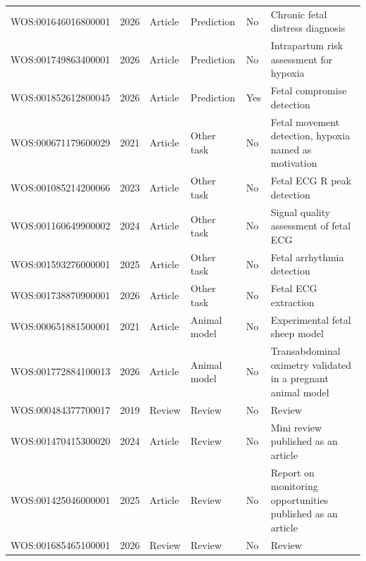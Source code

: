 \begin{longtable}{@{}p{3.5cm}rlllp{5.2cm}@{}}
WOS:001646016800001 & 2026 & Article & Prediction & No & Chronic fetal distress diagnosis \\
WOS:001749863400001 & 2026 & Article & Prediction & No & Intrapartum risk assessment for hypoxia \\
WOS:001852612800045 & 2026 & Article & Prediction & Yes & Fetal compromise detection \\
WOS:000671179600029 & 2021 & Article & Other task & No & Fetal movement detection, hypoxia named as motivation \\
WOS:001085214200066 & 2023 & Article & Other task & No & Fetal ECG R peak detection \\
WOS:001160649900002 & 2024 & Article & Other task & No & Signal quality assessment of fetal ECG \\
WOS:001593276000001 & 2025 & Article & Other task & No & Fetal arrhythmia detection \\
WOS:001738870900001 & 2026 & Article & Other task & No & Fetal ECG extraction \\
WOS:000651881500001 & 2021 & Article & Animal model & No & Experimental fetal sheep model \\
WOS:001772884100013 & 2026 & Article & Animal model & No & Transabdominal oximetry validated in a pregnant animal model \\
WOS:000484377700017 & 2019 & Review & Review & No & Review \\
WOS:001470415300020 & 2024 & Article & Review & No & Mini review published as an article \\
WOS:001425046000001 & 2025 & Article & Review & No & Report on monitoring opportunities published as an article \\
WOS:001685465100001 & 2026 & Review & Review & No & Review \\
\end{longtable}
